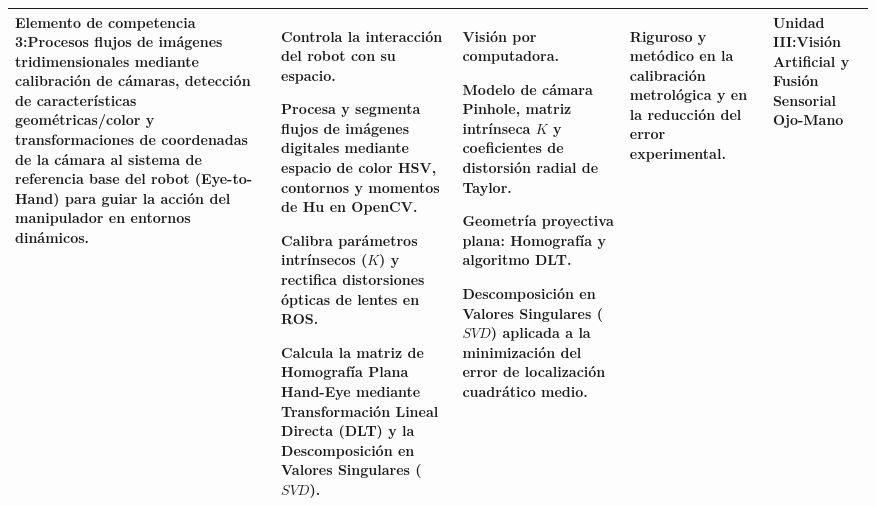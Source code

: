 \documentclass[11pt, letterpaper]{article}
\begin{document}
\begin{xltabular}{\textwidth}{|>{\raggedright\arraybackslash}p{3.5cm}|>{\raggedright\arraybackslash}X|>{\raggedright\arraybackslash}X|>{\raggedright\arraybackslash}X|>{\centering\arraybackslash}p{2.5cm}|}
\textbf{Elemento de competencia 3:}\newline Procesos flujos de imágenes tridimensionales mediante calibración de cámaras, detección de características geométricas/color y transformaciones de coordenadas de la cámara al sistema de referencia base del robot (Eye-to-Hand) para guiar la acción del manipulador en entornos dinámicos.
& \begin{tabitemize}
    \item Controla la interacción del robot con su espacio.
    \item Procesa y segmenta flujos de imágenes digitales mediante espacio de color HSV, contornos y momentos de Hu en OpenCV.
    \item Calibra parámetros intrínsecos ($K$) y rectifica distorsiones ópticas de lentes en ROS.
    \item Calcula la matriz de Homografía Plana Hand-Eye mediante Transformación Lineal Directa (DLT) y la Descomposición en Valores Singulares ($SVD$).
\end{tabitemize}
& \begin{tabitemize}
    \item Visión por computadora.
    \item Modelo de cámara Pinhole, matriz intrínseca $K$ y coeficientes de distorsión radial de Taylor.
    \item Geometría proyectiva plana: Homografía y algoritmo DLT.
    \item Descomposición en Valores Singulares ($SVD$) aplicada a la minimización del error de localización cuadrático medio.
\end{tabitemize}
& \begin{tabitemize}
    \item Riguroso y metódico en la calibración metrológica y en la reducción del error experimental.
\end{tabitemize}
& Unidad III:\newline Visión Artificial y Fusión Sensorial Ojo-Mano
\\ \hline


\end{xltabular}
\end{document}
